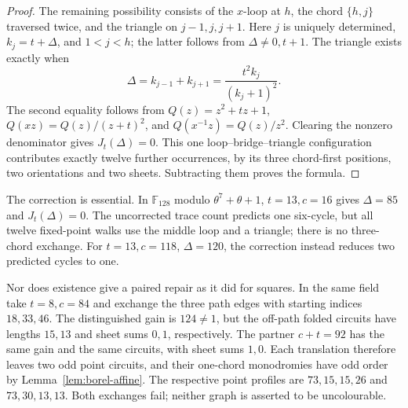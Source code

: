 \documentclass[11pt,a4paper]{article}
\theoremstyle{definition}
\theoremstyle{remark}
\begin{document}
\begin{proof}
The remaining possibility consists of the $x$-loop at $h$, the chord $\{h,j\}$ traversed twice, and the triangle on $j-1,j,j+1$.  Here $j$ is uniquely determined, $k_j=t+\Delta$, and $1<j<h$; the latter follows from $\Delta\ne0,t+1$.  The triangle exists exactly when
\[
 \Delta=k_{j-1}+k_{j+1}
       =\frac{t^2 k_j}{(k_j+1)^2}.
\]
The second equality follows from $Q(z)=z^2+tz+1$, $Q(xz)=Q(z)/(z+t)^2$, and $Q(x^{-1}z)=Q(z)/z^2$.  Clearing the nonzero denominator gives $J_t(\Delta)=0$.  This one loop--bridge--triangle configuration contributes exactly twelve further occurrences, by its three chord-first positions, two orientations and two sheets.  Subtracting them proves the formula.
\end{proof}

The correction is essential.  In $\mathbb F_{128}$ modulo $\theta^7+\theta+1$, $t=13,c=16$ gives $\Delta=85$ and $J_t(\Delta)=0$.  The uncorrected trace count predicts one six-cycle, but all twelve fixed-point walks use the middle loop and a triangle; there is no three-chord exchange.  For $t=13,c=118$, $\Delta=120$, the correction instead reduces two predicted cycles to one.

Nor does existence give a paired repair as it did for squares.  In the same field take $t=8,c=84$ and exchange the three path edges with starting indices $18,33,46$.  The distinguished gain is $124\ne1$, but the off-path folded circuits have lengths $15,13$ and sheet sums $0,1$, respectively.  The partner $c+t=92$ has the same gain and the same circuits, with sheet sums $1,0$.  Each translation therefore leaves two odd point circuits, and their one-chord monodromies have odd order by Lemma~\ref{lem:borel-affine}.  The respective point profiles are $73,15,15,26$ and $73,30,13,13$.  Both exchanges fail; neither graph is asserted to be uncolourable.
\end{document}
